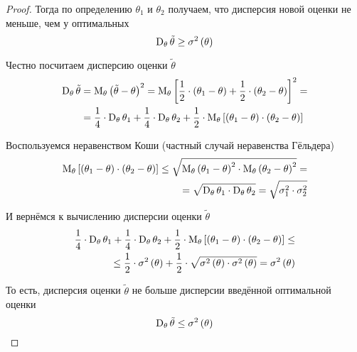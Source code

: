 \begin{proof}
  Тогда по определению $\theta_1$ и $\theta_2$ получаем,
  что дисперсия новой оценки не меньше, чем у оптимальных
  \begin{equation}\label{eq:estimator_ge}
    \operatorname{D}_{\theta} \tilde{\theta}\ge\sigma^2\left(\theta\right)
  \end{equation}

  Честно посчитаем дисперсию оценки $\tilde{\theta}$
  \begin{align*}
  \operatorname{D}_{\theta} \tilde{\theta}
    &=\operatorname{M}_{\theta} \left( \tilde{\theta}-\theta \right)^2
    =\operatorname{M}_{\theta} \left[ \frac{1}{2}\cdot\left( \theta_1-\theta \right)
      +\frac{1}{2}\cdot\left( \theta_2-\theta \right) \right]^2=\\
    &=\frac{1}{4}\cdot\operatorname{D}_{\theta} \theta_1
      +\frac{1}{4}\cdot\operatorname{D}_{\theta} \theta_2
      +\frac{1}{2}\cdot\operatorname{M}_{\theta} \left[ \left( \theta_1-\theta \right)
          \cdot\left( \theta_2-\theta \right) \right]
  \end{align*}

  Воспользуемся неравенством Коши (частный случай неравенства Гёльдера)
  \begin{eqnarray}\label{eq:koshi_eq}
    \operatorname{M}_{\theta} \left[ \left( \theta_1-\theta \right)
      \cdot\left( \theta_2-\theta \right) \right]
    \le\sqrt{\operatorname{M}_{\theta} \left( \theta_1-\theta \right)^2
      \cdot\operatorname{M}_{\theta} \left( \theta_2-\theta \right)^2}=\\
    =\sqrt{\operatorname{D}_{\theta} \theta_1
      \cdot\operatorname{D}_{\theta} \theta_2}
    =\sqrt{\sigma_1^2\cdot\sigma_2^2}\nonumber
  \end{eqnarray}
    
  И вернёмся к вычислению дисперсии оценки $\tilde{\theta}$
  \begin{align*}
    \frac{1}{4}\cdot\operatorname{D}_{\theta} \theta_1
      +\frac{1}{4}\cdot\operatorname{D}_{\theta} \theta_2
      +\frac{1}{2}\cdot\operatorname{M}_{\theta} \left[ \left( \theta_1-\theta \right)
          \cdot\left( \theta_2-\theta \right) \right]\le\\
    \le\frac{1}{2}\cdot\sigma^2\left( \theta \right)
      +\frac{1}{2}\cdot\sqrt{\sigma^2\left( \theta \right)
        \cdot\sigma^2\left( \theta \right)}
    =\sigma^2\left( \theta \right)
  \end{align*}

  То есть, дисперсия оценки $\tilde{\theta}$ не больше дисперсии
  введённой оптимальной оценки
  \begin{equation}\label{eq:estimator_le}
    \operatorname{D}_{\theta} \tilde{\theta}\le\sigma^2\left(\theta\right)
  \end{equation}


\end{proof}
